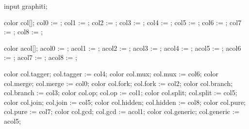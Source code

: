 \startmodule[graphiti]

\definecolor[col0][x=8dd3c7]
\definecolor[col1][x=ffffb3]
\definecolor[col2][x=bebada]
\definecolor[col3][x=fb8072]
\definecolor[col4][x=80b1d3]
\definecolor[col5][x=fdb462]
\definecolor[col6][x=b3de69]
\definecolor[col7][x=fccde5]
\definecolor[col8][x=d9d9d9]

\definecolor[acol0][x=fbb4ae]
\definecolor[acol1][x=b3cde3]
\definecolor[acol2][x=ccebc5]
\definecolor[acol3][x=decbe4]
\definecolor[acol4][x=fed9a6]
\definecolor[acol5][x=ffffcc]
\definecolor[acol6][x=e5d8bd]
\definecolor[acol7][x=fddaec]

\startMPextensions
  input graphiti;

  color col[];
  col0 := ;
  col1 := ;
  col2 := ;
  col3 := ;
  col4 := ;
  col5 := ;
  col6 := ;
  col7 := ;
  col8 := ;

  color acol[];
  acol0 := ;
  acol1 := ;
  acol2 := ;
  acol3 := ;
  acol4 := ;
  acol5 := ;
  acol6 := ;
  acol7 := ;
  acol8 := ;

  color col.tagger; col.tagger := col4;
  color col.mux; col.mux := col6;
  color col.merge; col.merge := col0;
  color col.fork; col.fork := col2;
  color col.branch; col.branch := col3;
  color col.op; col.op := col1;
  color col.split; col.split := col5;
  color col.join; col.join := col5;
  color col.hidden; col.hidden := col8;
  color col.pure; col.pure := col7;
  color col.gcd; col.gcd := acol1;
  color col.generic; col.generic := acol5;
\stopMPextensions

\stopmodule


